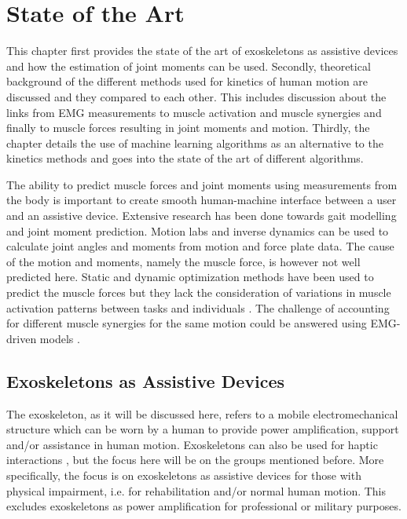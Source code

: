 \section{State of the Art}
This chapter first provides the state of the art of exoskeletons as assistive devices and how the estimation of joint moments can be used. 
Secondly, theoretical background of the different methods used for kinetics of human motion are discussed and they compared to each other.
This includes discussion about the links from EMG measurements to muscle activation and muscle synergies and finally to muscle forces resulting in joint moments and motion.
Thirdly, the chapter details the use of machine learning algorithms as an alternative to the kinetics methods and goes into the state of the art of different algorithms.

The ability to predict muscle forces and joint moments using measurements from the body is important to create smooth human-machine interface between a user and an assistive device.
Extensive research has been done towards gait modelling and joint moment prediction. 
Motion labs and inverse dynamics can be used to calculate joint angles and moments from motion and force plate data. 
The cause of the motion and moments, namely the muscle force, is however not well predicted here. 
Static and dynamic optimization methods have been used to predict the muscle forces but they lack the consideration of variations in muscle activation patterns between tasks and individuals \cite{Pizzolato2015, Sartori2012a}. 
The challenge of accounting for different muscle synergies for the same motion could be answered using EMG-driven models \cite{Pizzolato2015, Sartori2012a}.

\subsection{Exoskeletons as Assistive Devices}
\label{sec:A-Exoskeletons}
The exoskeleton, as it will be discussed here, refers to a mobile electromechanical structure which can be worn by a human to provide power amplification, support and/or assistance in human motion. Exoskeletons can also be used for haptic interactions \cite{Anam2012}, but the focus here will be on the groups mentioned before. More specifically, the focus is on exoskeletons as assistive devices for those with physical impairment, i.e. for rehabilitation and/or normal human motion. This excludes exoskeletons as power amplification for professional or military purposes.

